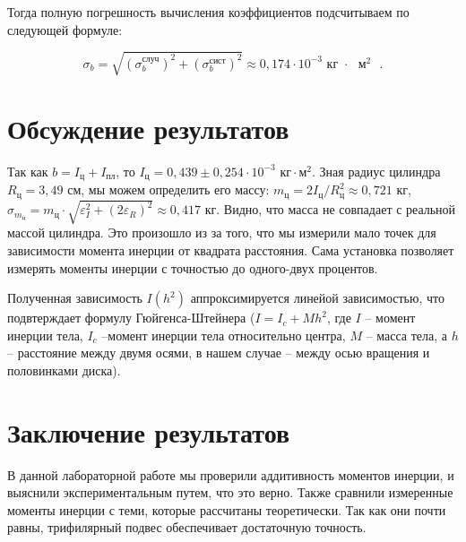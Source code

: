 \documentclass[a4paper,12pt]{article}
\begin{document}
	Тогда полную погрешность вычисления коэффициентов подсчитываем по следующей формуле:
	
	\begin{equation}
		\sigma_b = \sqrt{\left( \sigma_b^\text{случ} \right)^2 + \left( \sigma_b^\text{сист} \right)^2 } \approx 0,174 \cdot 10^{-3} \text{ кг $\cdot$ $\text{м}^2$ }.
	\end{equation}
	
\section{Обсуждение результатов}
    Так как $b = I_ц + I_{пл}$, то $I_ц = 0,439 \pm 0,254 \cdot 10^{-3} \text{ кг} \cdot \text{м}^2$.
    Зная радиус цилиндра $R_\text{ц} = 3,49$ см, мы можем определить его массу: $m_\text{ц} = 2I_\text{ц}/R_\text{ц}^2 \approx 0,721$ кг, $\sigma_{m_\text{ц}} = m_\text{ц} \cdot \sqrt{\varepsilon_I^2+\left(2\varepsilon_R\right)^2} \approx  0,417$ кг.
    Видно, что масса не совпадает с реальной массой цилиндра. Это произошло из за того, что мы измерили мало точек для зависимости момента инерции от квадрата расстояния.
    Сама установка позволяет измерять моменты инерции с точностью до одного-двух процентов.

    Полученная зависимость $I(h^2)$ аппроксимируется линейой зависимостью, что подвтерждает формулу Гюйгенса-Штейнера ($I = I_c + Mh^2$, где $I$ -- момент инерции тела, $I_c$ --момент инерции тела относительно центра, $M$ -- масса тела, а $h$ -- расстояние между двумя осями, в нашем случае -- между осью вращения и половинками диска).
\section{Заключение результатов}
    В данной лабораторной работе мы проверили аддитивность моментов инерции, и выяснили экспериментальным путем, что это верно. Также сравнили измеренные моменты инерции с теми, которые рассчитаны теоретически. Так как они почти равны, трифилярный подвес обеспечивает достаточную точность.
\end{document}

